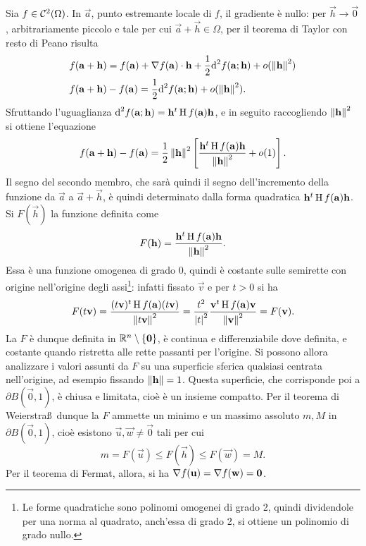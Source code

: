 Sia $f\in\mathcal{C}^{{2}}(\Omega)$. In $\vec a$, punto estremante locale di $f$, il gradiente è nullo: per $\vec h\to\vec 0$, arbitrariamente piccolo e tale per cui $\vec a+\vec h\in\Omega$, per il teorema di Taylor con resto di Peano risulta
\begin{align}
&f(\mathbf{a}+\mathbf{h})=f(\mathbf{a})+{\nabla f(\mathbf{a})}\cdot{\mathbf{h}}+\frac12\textup{d}^2f(\mathbf{a};\mathbf{h})+o(\left\|{\mathbf{h}}\right\|^2)\\
&f(\mathbf{a}+\mathbf{h})-f(\mathbf{a})=\frac12\textup{d}^2f(\mathbf{a};\mathbf{h})+o(\left\|{\mathbf{h}}\right\|^2).
\end{align}
Sfruttando l'uguaglianza %
$\textup{d}^2f(\mathbf{a};\mathbf{h})=\mathbf{h}^t\operatorname{H} f(\mathbf{a})\mathbf{h}$, e in seguito raccogliendo $\left\|{\mathbf{h}}\right\|^2$ si ottiene l'equazione
\begin{equation}
f(\mathbf{a}+\mathbf{h})-f(\mathbf{a})=\frac12\left\|{\mathbf{h}}\right\|^2\left[\frac{\mathbf{h}^t\operatorname{H} f(\mathbf{a})\mathbf{h}}{\left\|{\mathbf{h}}\right\|^2}+o(1)\right].
\end{equation}
Il segno del secondo membro, che sarà quindi il segno dell'incremento della funzione da $\vec a$ a $\vec a+\vec h$, è quindi determinato dalla forma quadratica $\mathbf{h}^t\operatorname{H} f(\mathbf{a})\mathbf{h}$. Si $F(\vec h)$ la funzione definita come
\[
F(\mathbf{h})=\frac{\mathbf{h}^t\operatorname{H} f(\mathbf{a})\mathbf{h}}{\left\|{\mathbf{h}}\right\|^2}.
\]
Essa è una funzione omogenea di grado 0, quindi è costante sulle semirette con origine nell'origine degli assi\footnote{Le forme quadratiche sono polinomi omogenei di grado 2, quindi dividendole per una norma al quadrato, anch'essa di grado 2, si ottiene un polinomio di grado nullo.}: infatti fissato $\vec v$ e per $t>0$ si ha
\[
F(t\mathbf{v})=\frac{(t\mathbf{v})^t\operatorname{H} f(\mathbf{a})(t\mathbf{v})}{\left\|{t\mathbf{v}}\right\|^2}=\frac{t^2}{\left|{t}\right|^2}\frac{\mathbf{v}^t\operatorname{H} f(\mathbf{a})\mathbf{v}}{\left\|{\mathbf{v}}\right\|^2}=F(\mathbf{v}).
\]
La $F$ è dunque definita in $\mathbb{R}^n\setminus\{\mathbf{0}\}$, è continua e differenziabile dove definita, e costante quando ristretta alle rette passanti per l'origine. Si possono allora analizzare i valori assunti da $F$ su una superficie sferica qualsiasi centrata nell'origine, ad esempio fissando $\left\|{\mathbf{h}}\right\|=1$. Questa superficie, che corrisponde poi a $\partial B(\vec 0,1)$, è chiusa e limitata, cioè è un insieme compatto. Per il teorema di Weierstra\ss\ dunque la $F$ ammette un minimo e un massimo assoluto $m,M$ in $\partial B(\vec 0,1)$, cioè esistono $\vec u,\vec w\neq\vec 0$ tali per cui
\begin{equation} \label{eq:maxmin_quadratica}
m=F(\vec u)\leq F(\vec h)\leq F(\vec w)=M.
\end{equation}
Per il teorema di Fermat, allora, si ha $\nabla f(\mathbf{u})=\nabla f(\mathbf{w})=\mathbf{0}$.

